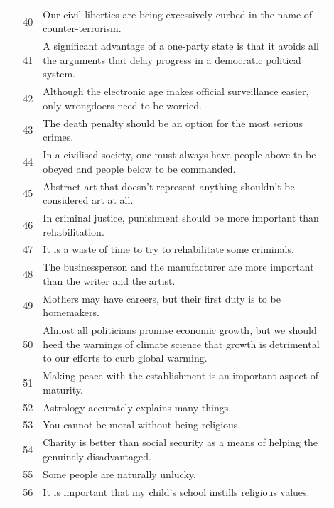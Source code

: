 \documentclass[11pt]{article}
\begin{document}
\begin{longtable}{r p{0.9\linewidth}}
\rowcolor{dom4} 40 & Our civil liberties are being excessively curbed in the name of counter-terrorism. \\
\rowcolor{dom4} 41 & A significant advantage of a one-party state is that it avoids all the arguments that delay progress in a democratic political system. \\
\rowcolor{dom4} 42 & Although the electronic age makes official surveillance easier, only wrongdoers need to be worried. \\
\rowcolor{dom4} 43 & The death penalty should be an option for the most serious crimes. \\
\rowcolor{dom4} 44 & In a civilised society, one must always have people above to be obeyed and people below to be commanded. \\
\rowcolor{dom4} 45 & Abstract art that doesn't represent anything shouldn't be considered art at all. \\
\rowcolor{dom4} 46 & In criminal justice, punishment should be more important than rehabilitation. \\
\rowcolor{dom4} 47 & It is a waste of time to try to rehabilitate some criminals. \\
\rowcolor{dom4} 48 & The businessperson and the manufacturer are more important than the writer and the artist. \\
\rowcolor{dom4} 49 & Mothers may have careers, but their first duty is to be homemakers. \\
\rowcolor{dom4} 50 & Almost all politicians promise economic growth, but we should heed the warnings of climate science that growth is detrimental to our efforts to curb global warming. \\
\rowcolor{dom4} 51 & Making peace with the establishment is an important aspect of maturity. \\

\rowcolor{dom5} 52 & Astrology accurately explains many things. \\
\rowcolor{dom5} 53 & You cannot be moral without being religious. \\
\rowcolor{dom5} 54 & Charity is better than social security as a means of helping the genuinely disadvantaged. \\
\rowcolor{dom5} 55 & Some people are naturally unlucky. \\
\rowcolor{dom5} 56 & It is important that my child's school instills religious values. \\


\end{longtable}
\end{document}
